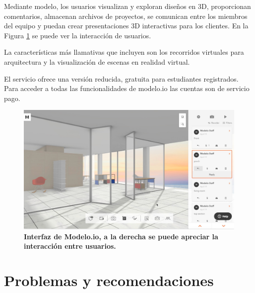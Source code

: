 Mediante modelo, los usuarios visualizan y exploran diseños en 3D, proporcionan comentarios, almacenan archivos de proyectos, se comunican entre los miembros del equipo y puedan crear presentaciones 3D interactivas para los clientes. En la Figura \ref{fig:modelo.io} se puede ver la interacción de usuarios.

La características más llamativas que incluyen son los recorridos virtuales para arquitectura y la visualización de escenas en realidad virtual.

El servicio ofrece una versión reducida, gratuita para estudiantes registrados. Para acceder a todas las funcionalidades de modelo.io las cuentas son de servicio pago.

\begin{figure}[h]
\includegraphics[width=14cm]{Img/WEB/web-modelo.jpg}
\centering
\caption{\textbf{ \footnotesize{Interfaz de Modelo.io, a la derecha se puede apreciar la interacción entre usuarios.}}}
\label{fig:modelo.io}
\end{figure}



\section{Problemas y recomendaciones
}